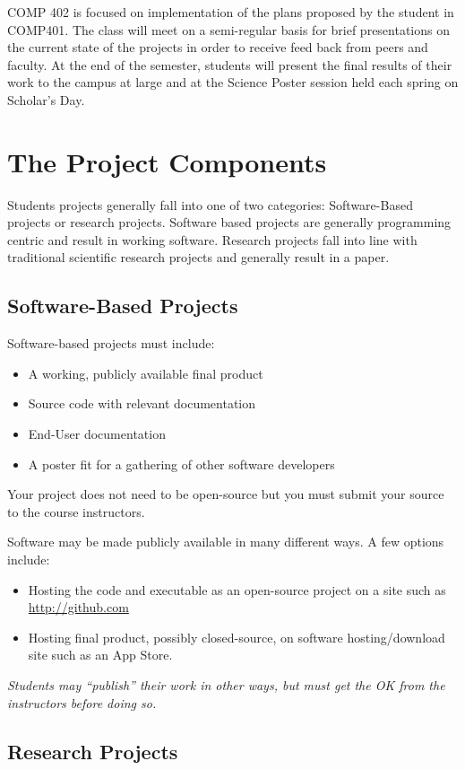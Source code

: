 \documentclass[10pt]{article}
\begin{document}
COMP 402 is focused on implementation of the plans proposed by the student in COMP401.  The class will meet on a semi-regular basis for  brief presentations on the current state of the projects in order to receive feed back from peers and faculty.  At the end of the semester, students will present the final results of their work to the campus at large and at the Science Poster session held each spring on Scholar's Day.


\section{The Project Components}

Students projects generally fall into one of two categories: Software-Based projects or research projects.  Software based projects are generally programming centric and result in working software.  Research projects fall into line with traditional scientific research projects and generally result in a paper. 

\subsection{Software-Based Projects}

Software-based projects must include:
\begin{itemize}
\item A working, publicly available final product
\item Source code with relevant documentation
\item End-User documentation
\item A poster fit for a gathering of other software developers
\end{itemize}
Your project does not need to be open-source but you must submit your source to the course instructors.

Software may be made publicly available in many different ways.  A few options include:
\begin{itemize}
\item Hosting the code and executable as an open-source project on a site such as \url{http://github.com}
\item Hosting final product, possibly closed-source, on software hosting/download site such as an App Store.
\end{itemize}
\textit{Students may ``publish'' their work in other ways, but must get the OK from the instructors before doing so.}

\subsection{Research Projects}
\end{document}
